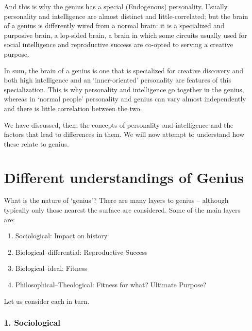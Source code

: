 \documentclass[
]{book}
\providecommand{\tightlist}{%
  \setlength{\itemsep}{0pt}\setlength{\parskip}{0pt}}
\begin{document}
And this is why the genius has a special (Endogenous) personality. Usually personality and intelligence are almost distinct and little-correlated; but the brain of a genius is differently wired from a normal brain: it is a specialized and purposive brain, a lop-sided brain, a brain in which some circuits usually used for social intelligence and reproductive success are co-opted to serving a creative purpose.

In sum, the brain of a genius is one that is specialized for creative discovery and both high intelligence and an `inner-oriented' personality are features of this specialization. This is why personality and intelligence go together in the genius, whereas in `normal people' personality and genius can vary almost independently and there is little correlation between the two.

We have discussed, then, the concepts of personality and intelligence and the factors that lead to differences in them. We will now attempt to understand how these relate to genius.

\hypertarget{different-understandings-of-genius}{%
\chapter{Different understandings of Genius}\label{different-understandings-of-genius}}

What is the nature of `genius'? There are many layers to genius -- although typically only those nearest the surface are considered. Some of the main layers are:

\begin{enumerate}
\def\labelenumi{\arabic{enumi}.}
\tightlist
\item
  Sociological: Impact on history
\item
  Biological--differential: Reproductive Success
\item
  Biological--ideal: Fitness
\item
  Philosophical--Theological: Fitness for what? Ultimate Purpose?
\end{enumerate}

Let us consider each in turn.

\hypertarget{sociological}{%
\subsection*{1. Sociological}\label{sociological}}
\end{document}
